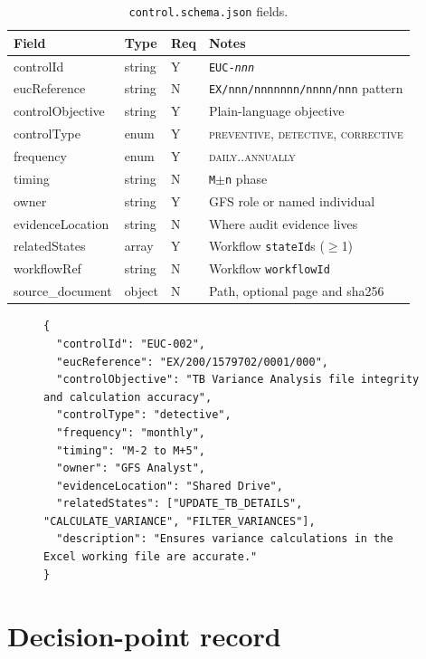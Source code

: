 \begin{table}[htbp]
\caption{\texttt{control.schema.json} fields.}\label{tab:control-fields}
\centering
\small
\begin{tabularx}{\linewidth}{@{}lllX@{}}
\toprule
\textbf{Field} & \textbf{Type} & \textbf{Req} & \textbf{Notes} \\ \midrule
controlId        & string  & Y & \texttt{EUC-\textit{nnn}} \\
eucReference     & string  & N & \texttt{EX/nnn/nnnnnnn/nnnn/nnn} pattern \\
controlObjective & string  & Y & Plain-language objective \\
controlType      & enum    & Y & \textsc{preventive}, \textsc{detective}, \textsc{corrective} \\
frequency        & enum    & Y & \textsc{daily}..\textsc{annually} \\
timing           & string  & N & \texttt{M$\pm$n} phase \\
owner            & string  & Y & GFS role or named individual \\
evidenceLocation & string  & N & Where audit evidence lives \\
relatedStates    & array   & Y & Workflow \texttt{stateId}s ($\ge$1) \\
workflowRef      & string  & N & Workflow \texttt{workflowId} \\
source\_document & object  & N & Path, optional page and sha256 \\
\bottomrule
\end{tabularx}
\end{table}

\begin{figure}[htbp]
\begin{lstlisting}[language=jsonx,caption={\texttt{EUC-002} variance-file
control record (abbreviated).},label=lst:euc-002]
{
  "controlId": "EUC-002",
  "eucReference": "EX/200/1579702/0001/000",
  "controlObjective": "TB Variance Analysis file integrity and calculation accuracy",
  "controlType": "detective",
  "frequency": "monthly",
  "timing": "M-2 to M+5",
  "owner": "GFS Analyst",
  "evidenceLocation": "Shared Drive",
  "relatedStates": ["UPDATE_TB_DETAILS", "CALCULATE_VARIANCE", "FILTER_VARIANCES"],
  "description": "Ensures variance calculations in the Excel working file are accurate."
}
\end{lstlisting}
\end{figure}

\section{Decision-point record}\label{sec:decision-point-schema}

